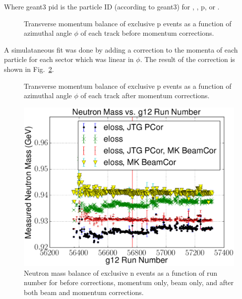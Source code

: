 Where geant3 pid is the particle ID (according to geant3) for \π[+], \π[-], p, \K[+] or \K[-].

\begin{figure}\begin{center}
\caption[Momentum Balance Before Corrections]{\label{fig:pbal}Transverse momentum balance of exclusive p \π[+] \π[-] events as a function of azimuthal angle $\phi$ of each track before momentum corrections.}
\end{center}\end{figure}

A simulataneous fit was done by adding a correction to the momenta of each particle for each sector which was linear in $\phi$. The result of the correction is shown in Fig.~\ref{fig:pbal_pcor}.

\begin{figure}\begin{center}
\caption[Momentum Balance After Corrections]{\label{fig:pbal_pcor}Transverse momentum balance of exclusive p \π[+] \π[-] events as a function of azimuthal angle $\phi$ of each track after momentum corrections.}
\end{center}\end{figure}

\begin{figure}\begin{center}
\includegraphics[width=0.6\columnwidth]{figures/corrections/C3pi_allcorr_neutron_rxr.eps}
\caption[Run by run Mass Balance Before and After Corrections]{\label{fig:mbal_pcor}Neutron mass balance of exclusive n \π[+] \π[+] \π[-] events as a function of run number for before corrections, momentum only, beam only, and after both beam and momentum corrections.}
\end{center}\end{figure}


\FloatBarrier
